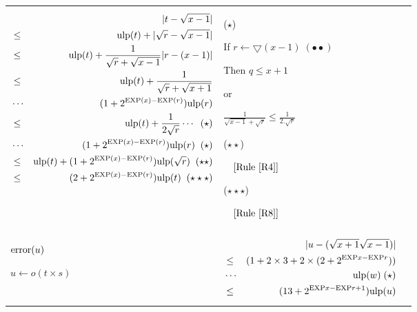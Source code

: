 \documentclass[12pt]{amsart}
\def\minf{\bigtriangledown}
\def\ulp{{\rm ulp}}
\def\Exp{{\rm EXP}}
\newcommand{\U}[1]{\quad \mbox{[Rule~\ref{#1}]}}
\begin{document}
\begin{center}
\begin{tabular}{l l l}
\begin{minipage}{7.5cm}
\begin{eqnarray}\nonumber
  &&|t-\sqrt{x-1}| \\\nonumber
  &       \leq& \ulp(t) + |\sqrt{r}-\sqrt{x-1}|\\\nonumber
  &       \leq& \ulp(t) + \frac{1}{\sqrt{r} + \sqrt{x-1}}|r-(x-1)|\\\nonumber
  &       \leq& \ulp(t) + \frac{1}{\sqrt{r} + \sqrt{x+1}} \\\nonumber
  &      \cdots & (1+2^{\Exp(x)-\Exp(r)}) \ulp(r)  \\\nonumber
  &       \leq& \ulp(t) + \frac{1}{2\sqrt{r}} \cdots \;\;(\star) \\\nonumber
  &\cdots& (1+2^{\Exp(x)-\Exp(r)}) \ulp(r) \;\;(\star) \\\nonumber
  &       \leq& \ulp(t) + (1+2^{\Exp(x)-\Exp(r)})\ulp(\sqrt{r}) \;\;(\star\star)\\\nonumber
  &       \leq& (2+2^{\Exp(x)-\Exp(r)}) \ulp(t) \;\;(\star\star\star)
\end{eqnarray}


\end{minipage} &
\begin{minipage}{6cm}

($\star$)

If $r \leftarrow \minf(x-1) \;(\bullet\bullet)$ 

Then $q \leq x+1$

or

$\frac{1}{\sqrt{x-1}+\sqrt{r}} \leq \frac{1}{2.\sqrt{r}}$

($\star\star$)

$\U{R4}$

($\star\star\star$)

$\U{R8}$

\end{minipage}\\%
\begin{minipage}{2.5cm}
${\textnormal{error}}(u)$


$u \leftarrow o(t \times s) $
\end{minipage} &
\begin{minipage}{7.5cm}

\begin{eqnarray}\nonumber
  &&|u-(\sqrt{x+1} \sqrt{x-1})| \\\nonumber
  &       \leq& (1+2 \times 3 +2 \times (2+2^{\Exp{x}-\Exp{r}}))\\\nonumber
  &       \cdots&  \ulp(w) \;(\star)\\\nonumber
  &       \leq& (13+2^{\Exp{x}-\Exp{r}+1}) \ulp(u)
\end{eqnarray}



\end{minipage}
\end{tabular}
\end{center}
\end{document}
